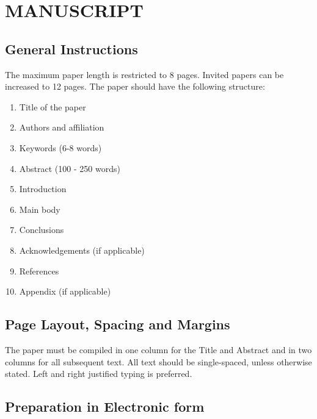 \documentclass{isprs}
\begin{document}
\maketitle


\section{MANUSCRIPT}\label{MANUSCRIPT}

\subsection{General Instructions}\label{sec:General Instructions}

The maximum paper length is restricted to 8 pages. Invited papers can be increased to 12 pages. The paper should have the following structure: 

\begin{enumerate}
\setlength\itemsep{0em}\setlength\parskip{0em}\setlength\topsep{0em}\setlength\partopsep{0em}\setlength\parsep{0em} 
\item{Title of the paper} 
\item{Authors and affiliation}
\item{Keywords (6-8 words)}
\item{Abstract (100 - 250 words)}
\item{Introduction}
\item{Main body}
\item{Conclusions}
\item{Acknowledgements (if applicable)}
\item{References}
\item{Appendix (if applicable)}
\end{enumerate}

\subsection{Page Layout, Spacing and Margins}\label{sec:Page Layout, Spacing and Margins}

The paper must be compiled in one column for the Title and Abstract and in two columns for all subsequent text. 
All text should be single-spaced, unless otherwise stated. Left and right justified typing is preferred.


\subsection{Preparation in Electronic form}\label{sec:Preparation in Electronic form}
\end{document}
